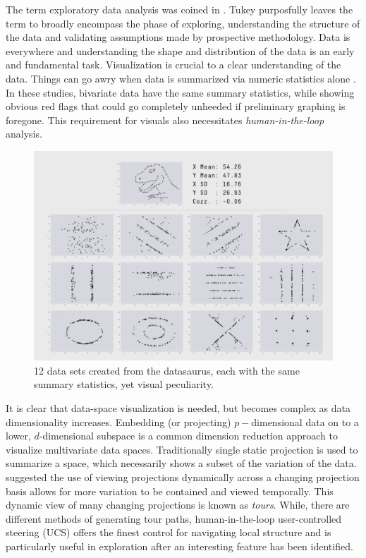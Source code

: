 \documentclass{monashthesis}
\begin{document}
The term exploratory data analysis was coined in
\textcite{tukey_exploratory_1977}. Tukey purposfully leaves the term to
broadly encompass the phase of exploring, understanding the structure of
the data and validating assumptions made by prospective methodology.
Data is everywhere and understanding the shape and distribution of the
data is an early and fundamental task. Visualization is crucial to a
clear understanding of the data. Things can go awry when data is
summarized via numeric statistics alone
\autocites{anscombe_graphs_1973}{matejka_same_2017}. In these studies,
bivariate data have the same summary statistics, while showing obvious
red flags that could go completely unheeded if preliminary graphing is
foregone. This requirement for visuals also necessitates
\emph{human-in-the-loop} analysis.




\begin{figure}

{\centering \includegraphics[width=0.7\linewidth]{./figures/matejka17fig} 

}

\caption{12 data sets created from the datasaurus, each
with the same summary statistics, yet visual peculiarity.}\label{fig:matejka17fig}
\end{figure}

It is clear that data-space visualization is needed, but becomes complex
as data dimensionality increases. Embedding (or projecting)
\(p-\)dimensional data on to a lower, \(d\)-dimensional subspace is a
common dimension reduction approach to visualize multivariate data
spaces. Traditionally single static projection is used to summarize a
space, which necessarily shows a subset of the variation of the data.
\textcite{asimov_grand_1985} suggested the use of viewing projections
dynamically across a changing projection basis allows for more variation
to be contained and viewed temporally. This dynamic view of many
changing projections is known as \emph{tours}. While, there are
different methods of generating tour paths, human-in-the-loop
user-controlled steering (UCS) offers the finest control for navigating
local structure and is particularly useful in exploration after an
interesting feature has been identified.
\end{document}
